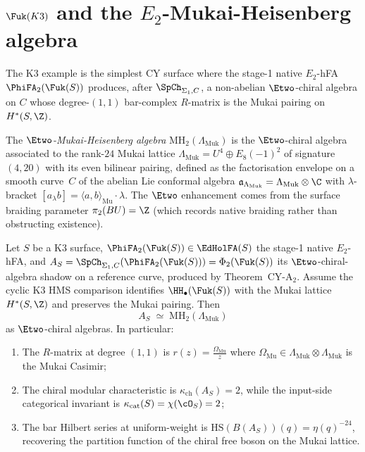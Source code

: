 \section{\texorpdfstring{$\Fuk(K3)$}{Fuk(K3)} and the \texorpdfstring{$E_2$}{E-2}-Mukai-Heisenberg algebra}
\label{sec:fukaya-mukai-heisenberg}

The K3 example is the simplest CY surface where the stage-1 native
$E_2$-hFA $\PhiFA_2(\Fuk(S))$ produces, after $\SpCh_{\Sigma_1, C}$,
a non-abelian $\Etwo$-chiral algebra on $C$ whose degree-$(1,1)$
bar-complex $R$-matrix is the Mukai pairing on $H^*(S, \Z)$.

\begin{definition}
\label{def:e2-mukai-heisenberg}
The \emph{$\Etwo$-Mukai-Heisenberg algebra} $\mathrm{MH}_2(\Lambda_{\mathrm{Muk}})$
is the $\Etwo$-chiral algebra associated to the rank-$24$
Mukai lattice $\Lambda_{\mathrm{Muk}} = U^4 \oplus E_8(-1)^2$ of signature $(4,20)$ with its
even bilinear pairing, defined as the factorisation envelope
on a smooth curve~$C$ of the abelian Lie conformal algebra
$\mathfrak{a}_{\Lambda_{\mathrm{Muk}}} = \Lambda_{\mathrm{Muk}} \otimes \C$ with
$\lambda$-bracket $[a_\lambda b] = \langle a, b \rangle_{\mathrm{Mu}} \cdot \lambda$.
The $\Etwo$ enhancement comes from the surface braiding parameter
$\pi_2(BU) = \Z$ (which records native braiding rather than
obstructing existence).
\end{definition}

\begin{theorem}
\label{thm:fukaya-k3-mukai-heisenberg}
Let $S$ be a K3 surface, $\PhiFA_2(\Fuk(S)) \in \EdHolFA(S)$ the
stage-1 native $E_2$-hFA, and
$A_S = \SpCh_{\Sigma_1, C}(\PhiFA_2(\Fuk(S))) = \Phi_2(\Fuk(S))$
its $\Etwo$-chiral-algebra shadow on a reference curve, produced by
Theorem~CY-A$_2$. Assume the cyclic K3 HMS comparison identifies
$\HH_\bullet(\Fuk(S))$ with the Mukai lattice
$H^*(S,\Z)$ and preserves the Mukai pairing. Then
\[
 A_S \;\simeq\; \mathrm{MH}_2(\Lambda_{\mathrm{Muk}})
\]
as $\Etwo$-chiral algebras. In particular:
\begin{enumerate}[label=(\roman*)]
 \item The $R$-matrix at degree $(1,1)$ is
 $r(z) = \frac{\Omega_{\mathrm{Mu}}}{z}$ where
 $\Omega_{\mathrm{Mu}} \in \Lambda_{\mathrm{Muk}} \otimes \Lambda_{\mathrm{Muk}}$
 is the Mukai Casimir;
 \item The chiral modular characteristic is
 $\kappa_{\mathrm{ch}}(A_S) = 2$, while the input-side categorical
 invariant is $\kappa_{\mathrm{cat}}(S)=\chi(\cO_S)=2$;
 \item The bar Hilbert series at uniform-weight is
 $\mathrm{HS}(B(A_S))(q) = \eta(q)^{-24}$, recovering the
 partition function of the chiral free boson on the Mukai
 lattice.
\end{enumerate}
\end{theorem}

